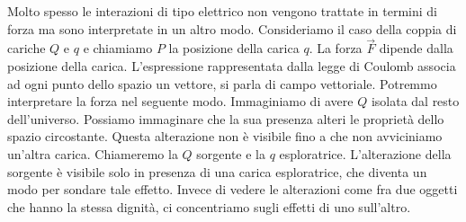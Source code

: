 Molto spesso le interazioni di tipo elettrico non vengono trattate in termini di forza ma sono interpretate in un altro modo.
Consideriamo il caso della coppia di cariche $Q$ e $q$ e chiamiamo $P$ la posizione della carica $q$. La forza $\vec{F}$ dipende dalla posizione della carica. L'espressione rappresentata dalla legge di Coulomb associa ad ogni punto dello spazio un vettore, si parla di campo vettoriale.
Potremmo interpretare la forza nel seguente modo. Immaginiamo di avere $Q$ isolata dal resto dell'universo. Possiamo immaginare che la sua presenza alteri le proprietà dello spazio circostante. Questa alterazione non è visibile fino a che non avviciniamo un'altra carica. Chiameremo la $Q$ sorgente e la $q$ esploratrice. L'alterazione della sorgente è visibile solo in presenza di una carica esploratrice, che diventa un modo per sondare tale effetto. Invece di vedere le alterazioni come fra due oggetti che hanno la stessa dignità, ci concentriamo sugli effetti di uno sull'altro.

